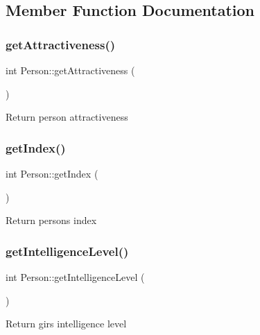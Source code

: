 \subsection{Member Function Documentation}
\mbox{\label{class_person_a5d9004521f0591b18c07e69423274714}} 
\subsubsection{\texorpdfstring{get\+Attractiveness()}{getAttractiveness()}}
{\footnotesize\ttfamily int Person\+::get\+Attractiveness (\begin{DoxyParamCaption}{ }\end{DoxyParamCaption})}

Return person attractiveness \mbox{\label{class_person_ac75bad62721ee53f0e765353984e1290}} 
\subsubsection{\texorpdfstring{get\+Index()}{getIndex()}}
{\footnotesize\ttfamily int Person\+::get\+Index (\begin{DoxyParamCaption}{ }\end{DoxyParamCaption})}

Return person\textquotesingle{}s index \mbox{\label{class_person_ac3fcb86ca37de466997783e1f60080a3}} 
\subsubsection{\texorpdfstring{get\+Intelligence\+Level()}{getIntelligenceLevel()}}
{\footnotesize\ttfamily int Person\+::get\+Intelligence\+Level (\begin{DoxyParamCaption}{ }\end{DoxyParamCaption})}

Return gir\textquotesingle{}s intelligence level \mbox{\label{class_person_ae1a03b01b79596d533e63c0a866e2525}} 
